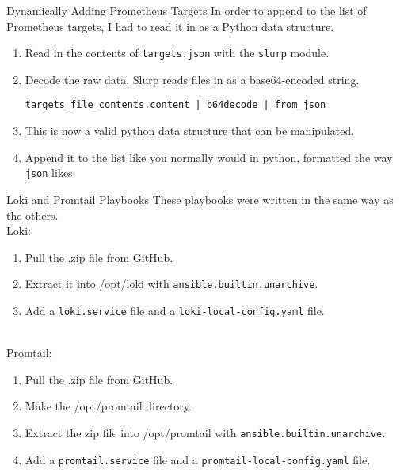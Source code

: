 \documentclass[14pt,compress,usenames,dvipsnames,aspectratio=169]{beamer}
\begin{document}
\begin{frame}{Dynamically Adding Prometheus Targets}
    In order to append to the list of Prometheus targets, I had to read it in as a
    Python data structure.  
    \begin{enumerate}
        \item{Read in the contents of \texttt{targets.json} with the \texttt{slurp} module.} 
        \item{Decode the raw data. Slurp reads files in as a base64-encoded string.

            \texttt{targets\_file\_contents.content | b64decode | from\_json} } 

        \item{This is now a valid python data structure that can be manipulated. } 
        \item{Append it to the list like you normally would in python, formatted the
            way \texttt{json} likes.  }
              
    \end{enumerate}
\end{frame}


\begin{frame}{Loki and Promtail Playbooks}
    These playbooks were written in the same way as the others.  \\
    Loki:
    \begin{enumerate}
        \item{Pull the .zip file from GitHub.}
        \item{Extract it into /opt/loki with \texttt{ansible.builtin.unarchive}.}
        \item{Add a \texttt{loki.service} file and a \texttt{loki-local-config.yaml} file.}
    \end{enumerate} \\
    Promtail:
    \begin{enumerate}
        \item{Pull the .zip file from GitHub.}
        \item{Make the /opt/promtail directory.}
        \item{Extract the zip file into /opt/promtail with \texttt{ansible.builtin.unarchive}.}
        \item{Add a \texttt{promtail.service} file and a \texttt{promtail-local-config.yaml} file.}
    \end{enumerate}
\end{frame}
\end{document}
